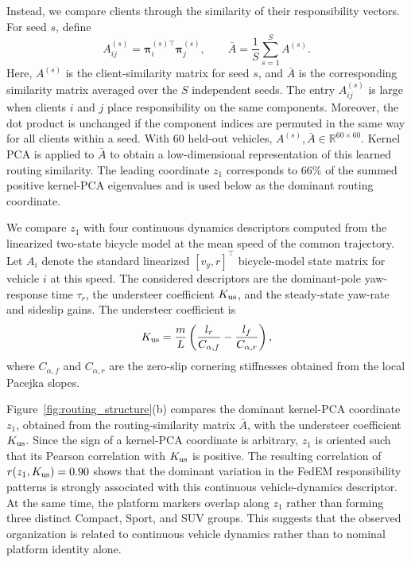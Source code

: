 Instead, we compare clients through the similarity of their responsibility vectors.
For seed $s$, define
%
\begin{equation}
A_{ij}^{(s)}=\boldsymbol\pi_i^{(s)\top}\boldsymbol\pi_j^{(s)},
\qquad
\bar A=\frac{1}{S}\sum_{s=1}^{S}A^{(s)}.
\label{eq:routing_affinity}
\end{equation}
%
Here, $A^{(s)}$ is the client-similarity matrix for seed $s$, and $\bar A$ is the corresponding similarity matrix averaged over the $S$ independent seeds.
The entry $A_{ij}^{(s)}$ is large when clients $i$ and $j$ place responsibility on the same components.
Moreover, the dot product is unchanged if the component indices are permuted in the same way for all clients within a seed.
With 60 held-out vehicles, $A^{(s)},\bar A\in\mathbb{R}^{60\times60}$.
Kernel PCA is applied to $\bar A$ to obtain a low-dimensional representation of this learned routing similarity.
The leading coordinate $z_1$ corresponds to $66\%$ of the summed positive kernel-PCA eigenvalues and is used below as the dominant routing coordinate.

We compare $z_1$ with four continuous dynamics descriptors computed from the linearized two-state bicycle model at the mean speed of the common trajectory.
Let $A_i$ denote the standard linearized $[v_y,r]^\top$ bicycle-model state matrix for vehicle $i$ at this speed.
The considered descriptors are the dominant-pole yaw-response time $\tau_r$, the understeer coefficient $K_{\rm us}$, and the steady-state yaw-rate and sideslip gains.
The understeer coefficient is
%
\begin{equation}
    K_{\rm us}=\frac{m}{L}\left(\frac{l_r}{C_{\alpha,f}}-\frac{l_f}{C_{\alpha,r}}\right),
\label{eq:kus}
\end{equation}
%
where $C_{\alpha,f}$ and $C_{\alpha,r}$ are the zero-slip cornering stiffnesses obtained from the local Pacejka slopes.

Figure~\ref{fig:routing_structure}(b) compares the dominant kernel-PCA coordinate $z_1$, obtained from the routing-similarity matrix $\bar A$, with the understeer coefficient $K_{\rm us}$.
Since the sign of a kernel-PCA coordinate is arbitrary, $z_1$ is oriented such that its Pearson correlation with $K_{\rm us}$ is positive.
The resulting correlation of $r(z_1,K_{\rm us})=0.90$ shows that the dominant variation in the FedEM responsibility patterns is strongly associated with this continuous vehicle-dynamics descriptor.
At the same time, the platform markers overlap along $z_1$ rather than forming three distinct Compact, Sport, and SUV groups.
This suggests that the observed organization is related to continuous vehicle dynamics rather than to nominal platform identity alone.

